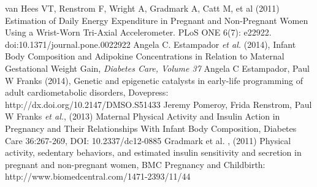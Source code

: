 \documentclass{article}
\begin{document}
\begin{thebibliography}{99} %
van Hees VT, Renstrom F, Wright A, Gradmark A, Catt M, et al (2011) Estimation of Daily Energy Expenditure in Pregnant and Non-Pregnant Women
Using a Wrist-Worn Tri-Axial Accelerometer. PLoS ONE 6(7): e22922. doi:10.1371/journal.pone.0022922
Angela C. Estampador \textit{et al.} (2014), Infant Body Composition and Adipokine Concentrations in Relation to Maternal Gestational Weight Gain,
\newblock \textit{Diabetes Care, Volume 37}
Angela C Estampador, Paul W Franks (2014), Genetic and epigenetic catalysts in early-life programming of adult cardiometabolic disorders, Dovepress: \\http://dx.doi.org/10.2147/DMSO.S51433
Jeremy Pomeroy, Frida Renstrom, Paul W Franks \textit{et al.}, (2013) Maternal Physical Activity and Insulin Action in Pregnancy and Their Relationships With Infant Body Composition, Diabetes Care 36:267-269, DOI: 10.2337/dc12-0885
Gradmark et al. , (2011) Physical activity, sedentary behaviors, and estimated insulin sensitivity and secretion in pregnant and non-pregnant women, BMC Pregnancy and Childbirth:
http://www.biomedcentral.com/1471-2393/11/44

\end{thebibliography}
\end{document}
